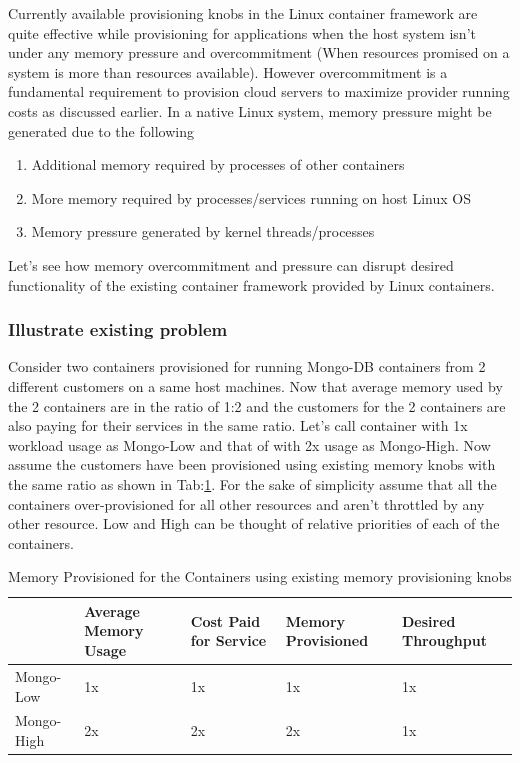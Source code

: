       Currently available provisioning knobs in the Linux container framework are quite effective while provisioning for applications when 
the host system isn't under any memory pressure and overcommitment (When resources promised on a system is more than resources available). 
However overcommitment is a fundamental requirement to provision cloud servers to maximize provider running costs as discussed earlier. In a 
native Linux system, memory pressure might be generated due to the following 

      \begin{enumerate}
	\item Additional memory required by processes of other containers
	\item More memory required by processes/services running on host Linux OS
	\item Memory pressure generated by kernel threads/processes
      \end{enumerate}
      
      Let's see how memory overcommitment and pressure can disrupt desired functionality of the existing container framework provided by 
Linux containers.
    
      \subsubsection{Illustrate existing problem}
	
	Consider two containers provisioned for running Mongo-DB containers from 2 different customers on a same host machines. Now that 
average memory used by the 2 containers are in the ratio of 1:2 and the customers for the 2 containers are also paying for their services in 
the same ratio. Let's call container with 1x workload usage as Mongo-Low and that of with 2x usage as Mongo-High. Now assume the customers 
have been provisioned using existing memory knobs with the same ratio as shown in Tab:\ref{table_initial}. For the sake of simplicity assume 
that all the containers over-provisioned for all other resources and aren't throttled by any other resource. Low and High can be thought of 
relative priorities of each of the containers.
	
	\vspace*{1em}	
	\begin{table}[!h]
	  \begin{center}
	    \begin{tabular}{ l | p{3cm} | p{2.2cm} | p{2.2cm} | p{2.2cm} }	      	    
		  & Average Memory Usage & Cost Paid for Service & Memory Provisioned & Desired Throughput \\ 
	      \hline
	      \hline
	      Mongo-Low  & 1x & 1x & 1x & 1x \\  
	      \hline
	      Mongo-High & 2x & 2x & 2x & 1x \\
		
	    \end{tabular}
	  \caption{Memory Provisioned for the Containers using existing memory provisioning knobs}
	  \label{table_initial}
	  \end{center}	  
	\end{table}
	\vspace*{1em}
	
